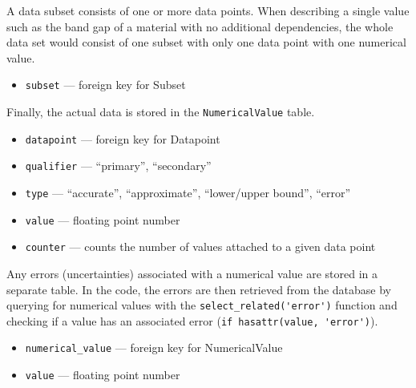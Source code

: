 \documentclass{article}
\begin{document}
A data subset consists of one or more data points. When describing a single value such as the band gap of a material with no additional dependencies, the whole data set would consist of one subset with only one data point with one numerical value.
\begin{tcolorbox}[colback=green!5,colframe=green!40!black,title=Datapoint(Base)]
  \begin{itemize}
  \item \texttt{subset} --- foreign key for Subset
  \end{itemize}
\end{tcolorbox}

Finally, the actual data is stored in the \texttt{NumericalValue} table.
\begin{tcolorbox}[colback=green!5,colframe=green!40!black,title=NumericalValue(Base)]
  \begin{itemize}
  \item \texttt{datapoint} --- foreign key for Datapoint
  \item \texttt{qualifier} --- ``primary'', ``secondary''
  \item \texttt{type} --- ``accurate'', ``approximate'', ``lower/upper bound'', ``error''
  \item \texttt{value} --- floating point number
  \item \texttt{counter} --- counts the number of values attached to a given data point
  \end{itemize}
\end{tcolorbox}

Any errors (uncertainties) associated with a numerical value are stored in a separate table. In the code, the errors are then retrieved from the database by querying for numerical values with the \verb+select_related('error')+ function and checking if a value has an associated error (\verb+if hasattr(value, 'error')+).
\begin{tcolorbox}[colback=green!5,colframe=green!40!black,title=Error(Base)]
  \begin{itemize}
  \item \texttt{numerical\_value} --- foreign key for NumericalValue
  \item \texttt{value} --- floating point number
  \end{itemize}
\end{tcolorbox}
\end{document}
